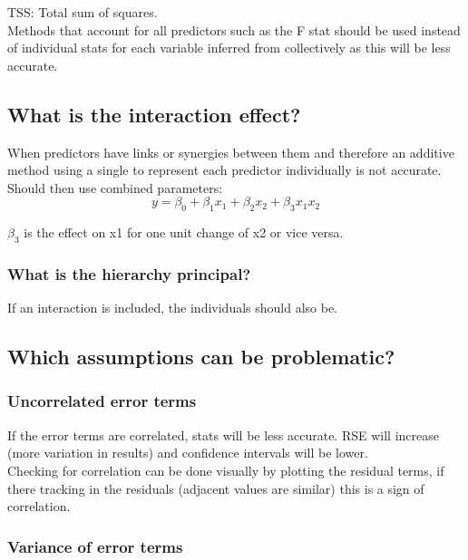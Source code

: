 \documentclass[11pt]{scrartcl} %
\begin{document}
TSS: Total sum of squares.\\

Methods that account for all predictors such as the F stat should be used instead of individual
stats for each variable inferred from collectively as this will be less accurate.

\subsection{What is the interaction effect?}

When predictors have links or synergies between them and therefore an additive method using a single
to represent each predictor individually is not accurate.\\

Should then use combined parameters:
\begin{equation}
	y = \beta_0 + \beta_1x_1 + \beta_2x_2 + \beta_3x_1x_2
\end{equation}

\(\beta_3\) is the effect on x1 for one unit change of x2 or vice versa.

\subsubsection{What is the hierarchy principal?}

If an interaction is included, the individuals should also be.

\subsection{Which assumptions can be problematic?}

\subsubsection{Uncorrelated error terms}

If the error terms are correlated, stats will be less accurate. RSE will increase (more variation in results)
and confidence intervals will be lower.\\

Checking for correlation can be done visually by plotting the residual terms, if there tracking in the residuals
(adjacent values are similar) this is a sign of correlation.

\subsubsection{Variance of error terms}
\end{document}
